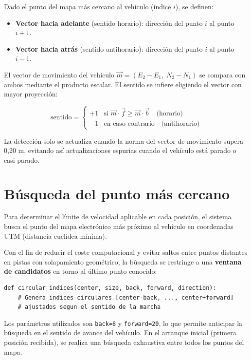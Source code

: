 \documentclass[10pt]{article}
\begin{document}
Dado el punto del mapa más cercano al vehículo (índice $i$), se definen:

\begin{itemize}[leftmargin=1.2em]
    \item \textbf{Vector hacia adelante} (sentido horario): dirección del punto $i$ al punto $i+1$.
    \item \textbf{Vector hacia atrás} (sentido antihorario): dirección del punto $i$ al punto $i-1$.
\end{itemize}

El vector de movimiento del vehículo $\vec{m} = (E_2 - E_1,\; N_2 - N_1)$ se compara con ambos mediante el producto escalar. El sentido se infiere eligiendo el vector con mayor proyección:

\[
\text{sentido} = \begin{cases}
+1 & \text{si } \vec{m} \cdot \vec{f} \geq \vec{m} \cdot \vec{b} \quad \text{(horario)} \\
-1 & \text{en caso contrario} \quad \text{(antihorario)}
\end{cases}
\]

La detección solo se actualiza cuando la norma del vector de movimiento supera 0{,}20 m, evitando así actualizaciones espurias cuando el vehículo está parado o casi parado.

\section{Búsqueda del punto más cercano}

Para determinar el límite de velocidad aplicable en cada posición, el sistema busca el punto del mapa electrónico más próximo al vehículo en coordenadas UTM (distancia euclídea mínima).

Con el fin de reducir el coste computacional y evitar saltos entre puntos distantes en pistas con solapamiento geométrico, la búsqueda se restringe a una \textbf{ventana de candidatos} en torno al último punto conocido:

\begin{lstlisting}[style=pythonEstilo]
def circular_indices(center, size, back, forward, direction):
    # Genera indices circulares [center-back, ..., center+forward]
    # ajustados segun el sentido de la marcha
\end{lstlisting}

Los parámetros utilizados son \texttt{back=8} y \texttt{forward=20}, lo que permite anticipar la búsqueda en el sentido de avance del vehículo. En el arranque inicial (primera posición recibida), se realiza una búsqueda exhaustiva entre todos los puntos del mapa.
\end{document}
